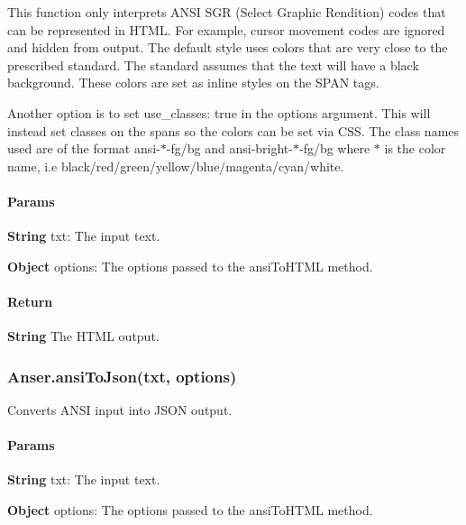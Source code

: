 This function only interprets A\+N\+SI S\+GR (Select Graphic Rendition) codes that can be represented in H\+T\+ML. For example, cursor movement codes are ignored and hidden from output. The default style uses colors that are very close to the prescribed standard. The standard assumes that the text will have a black background. These colors are set as inline styles on the S\+P\+AN tags.

Another option is to set {\ttfamily use\+\_\+classes\+: true} in the options argument. This will instead set classes on the spans so the colors can be set via C\+SS. The class names used are of the format {\ttfamily ansi-\/$\ast$-\/fg/bg} and {\ttfamily ansi-\/bright-\/$\ast$-\/fg/bg} where {\ttfamily $\ast$} is the color name, i.\+e black/red/green/yellow/blue/magenta/cyan/white. \paragraph*{Params}


\begin{DoxyItemize}
\item {\bfseries String} {\ttfamily txt}\+: The input text.
\item {\bfseries Object} {\ttfamily options}\+: The options passed to the ansi\+To\+H\+T\+ML method.
\end{DoxyItemize}

\paragraph*{Return}


\begin{DoxyItemize}
\item {\bfseries String} The H\+T\+ML output.
\end{DoxyItemize}

\subsubsection*{{\ttfamily Anser.\+ansi\+To\+Json(txt, options)}}

Converts A\+N\+SI input into J\+S\+ON output. \paragraph*{Params}


\begin{DoxyItemize}
\item {\bfseries String} {\ttfamily txt}\+: The input text.
\item {\bfseries Object} {\ttfamily options}\+: The options passed to the ansi\+To\+H\+T\+ML method.
\end{DoxyItemize}

